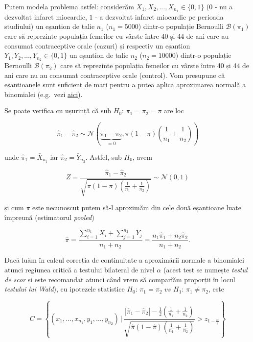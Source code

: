 \documentclass[]{article}
\begin{document}
Putem modela problema astfel: considerăm
\(X_1, X_2, \ldots, X_{n_1}\in\{0,1\}\) (\(0\) - nu a dezvoltat infarct
miocardic, \(1\) - a dezvoltat infarct miocardic pe perioada studiului)
un eșantion de talie \(n_1\) (\(n_1 = 5000\)) dintr-o populație
Bernoulli \(\mathcal{B}(\pi_1)\) care să reprezinte populația femeilor
cu vârste între 40 și 44 de ani care au consumat contraceptive orale
(cazuri) și respectiv un eșantion
\(Y_1, Y_2, \ldots, Y_{n_2}\in\{0,1\}\) un eșantion de talie \(n_2\)
(\(n_2 = 10000\)) dintr-o populație Bernoulli \(\mathcal{B}(\pi_2)\)
care să reprezinte populația femeilor cu vârste între 40 și 44 de ani
care nu au consumat contraceptive orale (control). Vom presupune că
eșantioanele sunt suficient de mari pentru a putea aplica aproximarea
normală a binomialei (e.g.~vezi
\href{https://alexamarioarei.github.io/Teaching/2017-2018/PS\%20web\%20page/labs/Lab_4.html\#3_aproximarea_poisson_\%C8\%99i_normal\%C4\%83_a_binomialei}{aici}).

Se poate verifica cu ușurință că sub \(H_0:\,\pi_1=\pi_2=\pi\) are loc

\[
  \hat{\pi}_1 - \hat{\pi}_2\sim\mathcal{N}\left(\underbrace{\pi_1-\pi_2}_{=0}, \pi(1-\pi)\left(\frac{1}{n_1} + \frac{1}{n_2}\right)\right)
\]

unde \(\hat{\pi}_1 = \bar{X}_{n_1}\) iar
\(\hat{\pi}_2 = \bar{Y}_{n_2}\). Astfel, sub \(H_0\), avem

\[
  Z = \frac{\hat{\pi}_1 - \hat{\pi}_2}{\sqrt{\pi(1-\pi)\left(\frac{1}{n_1} + \frac{1}{n_2}\right)}} \sim \mathcal{N}(0,1)
\]

și cum \(\pi\) este necunoscut putem să-l aproximăm din cele două
eșantioane luate împreună (estimatorul \emph{pooled})

\[
  \hat{\pi} = \frac{\sum_{i = 1}^{n_1}X_i + \sum_{j = 1}^{n_2}Y_j}{n_1+n_2} = \frac{n_1\hat{\pi}_1 + n_2\hat{\pi}_2}{n_1+n_2}.
\]

Dacă luăm în calcul corecția de continuitate a aproximării normale a
binomialei atunci regiunea critică a testului bilateral de nivel
\(\alpha\) (acest test se numește \emph{testul de scor} și este
recomandat atunci când vrem să comparîăm proporții în locul
\emph{testului lui Wald}), cu ipotezele statistice
\(H_0:\,\pi_1=\pi_2\,\,vs\,\,H_1:\,\pi_1\neq \pi_2\), este

\[
  C = \left\{(x_1,\ldots,x_{n_1},y_1,\ldots,y_{n_2})\,|\,\frac{|\hat{\pi}_1 - \hat{\pi}_2| - \frac{1}{2}\left(\frac{1}{n_1} + \frac{1}{n_2}\right)}{\sqrt{\hat{\pi}(1-\hat{\pi})\left(\frac{1}{n_1} + \frac{1}{n_2}\right)}}>z_{1-\frac{\alpha}{2}}\right\}
\]
\end{document}
